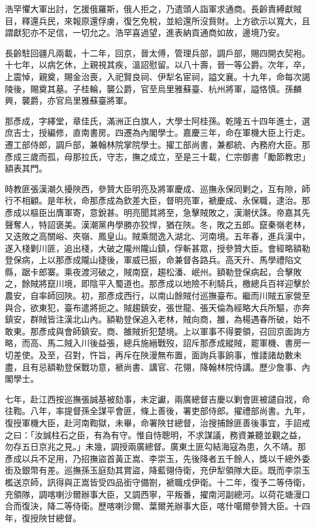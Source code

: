 \begin{pinyinscope}
浩罕懼大軍出討，乞援俄羅斯，俄人拒之，乃遣頭人詣軍求通商。長齡責縛獻賊目，釋還兵民，來報原還俘虜，復乞免稅，並給還所沒貲財。上方欲示以寬大，且謂獻犯亦不足信，一切允之。浩罕喜過望，進表納貢通商如故，邊境乃安。

長齡駐回疆凡兩載，十二年，回京，晉太傅，管理兵部，調戶部，賜四開衣契袍。十七年，以病乞休，上親視其疾，溫詔慰留。以八十壽，晉一等公爵。次年，卒，上震悼，親奠，賜金治喪，入祀賢良祠、伊犁名宦祠，謚文襄。十九年，命每次謁陵後，賜奠其墓。子桂輪，襲公爵，官至烏里雅蘇臺、杭州將軍，謚恪慎。孫麟興，襲爵，亦官烏里雅蘇臺將軍。

那彥成，字繹堂，章佳氏，滿洲正白旗人，大學士阿桂孫。乾隆五十四年進士，選庶吉士，授編修，直南書房。四遷為內閣學士。嘉慶三年，命在軍機大臣上行走。遷工部侍郎，調戶部，兼翰林院掌院學士。擢工部尚書，兼都統、內務府大臣。那彥成三歲而孤，母那拉氏，守志，撫之成立，至是三十載，仁宗御書「勵節教忠」額表其門。

時教匪張漢潮久擾陜西，參贊大臣明亮及將軍慶成、巡撫永保同剿之，互有隙，師行不相顧。是年秋，命那彥成為欽差大臣，督明亮軍，褫慶成、永保職，逮治。那彥成以樞臣出膺軍寄，意銳甚。明亮聞其將至，急擊賊敗之，漢潮伏誅。帝嘉其先聲奪人，特詔褒美。漢潮黨冉學勝亦狡悍，猶在陜。冬，敗之五郎。竄秦嶺老林，又迭敗之高關峪、夾嶺、鳳皇山。賊乘間逸入湖北、河南境。五年春，進兵漢中，遂入棧剿川匪，追出棧，大破之隴州隴山鎮，俘斬甚眾，授參贊大臣。會經略額勒登保病，上以那彥成隴山捷後，軍威已振，命兼督各路兵。高天升、馬學禮陷文縣，踞卡郎寨。乘夜渡河破之，賊南竄，趨松潘、岷州。額勒登保病起，合擊敗之，餘賊將竄川境，即陰平入蜀道也。那彥成以地險不利騎兵，檄總兵百祥迎擊於農安，自率師回陜。初，那彥成西行，以南山餘賊付巡撫臺布。繼而川賊五家營至與合，欲東犯，臺布遣將扼之。賊趨鎮安，張世龍、張天倫為經略大兵所驅，亦奔鎮安，群賊皆注漢北山內。額勒登保追入老林，賊向商，雒，為楊遇春所破，始不敢東。那彥成與會師鎮安。商、雒賊折犯楚境。上以軍事不得要領，召回京面詢方略，而高、馬二賊入川後益張，總兵施縉戰歿，詔斥那彥成縱賊，罷軍機、書房一切差使。及至，召對，忤旨，再斥在陜漫無布置，面詢兵事餉事，惟諉諸劫數未盡，且有忌額勒登保戰功意，褫尚書、講官、花翎，降翰林院侍講。歷少詹事、內閣學士。

七年，赴江西按巡撫張誠基被劾事，未定讞，兩廣總督吉慶以剿會匪被譴自戕，命往鞫。八年，率提督孫全謀平會匪，條上善後，署吏部侍郎。擢禮部尚書。九年，復授軍機大臣，赴河南鞫獄，未畢，命署陜甘總督，治搜捕餘匪善後事宜，手詔戒之曰：「汝誠柱石之臣，有為有守。惟自恃聰明，不求謀議，務資兼聽並觀之益，勿存五日京兆之見。」未幾，調授兩廣總督。廣東土匪勾結海寇為患，久不靖。那彥成以兵不足用，乃招撫盜首黃正嵩、李崇玉，先後降者五千餘人，獎以千總外委銜及銀幣有差。巡撫孫玉庭劾其賞盜，降藍翎侍衛，充伊犁領隊大臣。既而李崇玉檻送京師，訊得與正嵩皆受四品銜守備劄，褫職戍伊衛。十二年，復予二等侍衛，充領隊，調喀喇沙爾辦事大臣，又調西寧，平叛番，擢南河副總河。以荷花塘漫口合而復決，降二等侍衛。歷喀喇沙爾、葉爾羌辦事大臣，喀什噶爾參贊大臣。十四年，復授陜甘總督。


\end{pinyinscope}
